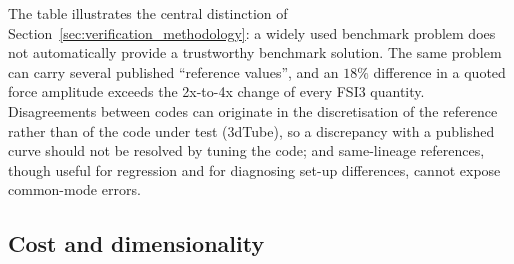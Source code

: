 The table illustrates the central distinction of Section~\ref{sec:verification_methodology}: a widely used benchmark problem does not automatically provide a trustworthy benchmark solution.
The same problem can carry several published ``reference values'', and an $18\%$ difference in a quoted force amplitude exceeds the 2x-to-4x change of every FSI3 quantity.
Disagreements between codes can originate in the discretisation of the reference rather than of the code under test (3dTube), so a discrepancy with a published curve should not be resolved by tuning the code; and same-lineage references, though useful for regression and for diagnosing set-up differences, cannot expose common-mode errors.

\subsection{Cost and dimensionality}\label{sec:cost}

